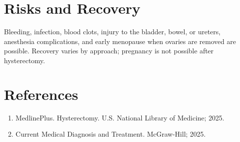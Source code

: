 \section*{Risks and Recovery}
Bleeding, infection, blood clots, injury to the bladder, bowel, or ureters, anesthesia complications, and early menopause when ovaries are removed are possible. Recovery varies by approach; pregnancy is not possible after hysterectomy.

\section*{References}
\begin{enumerate}
  \item MedlinePlus. Hysterectomy. U.S. National Library of Medicine; 2025.
  \item Current Medical Diagnosis and Treatment. McGraw-Hill; 2025.
\end{enumerate}
\clearpage
